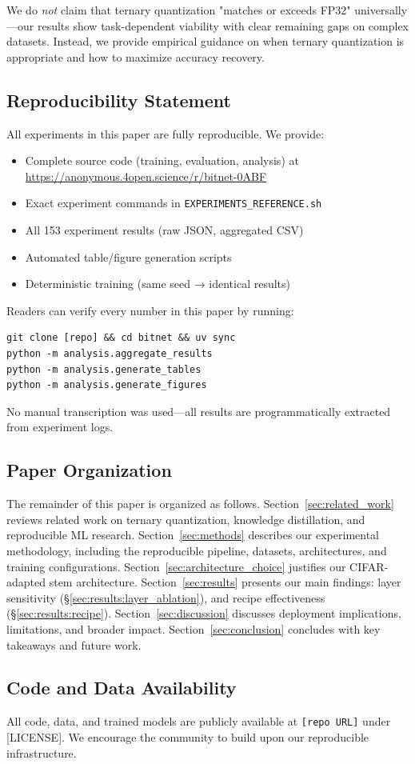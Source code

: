 We do \textit{not} claim that ternary quantization "matches or exceeds FP32" universally—our results show task-dependent viability with clear remaining gaps on complex datasets. Instead, we provide empirical guidance on when ternary quantization is appropriate and how to maximize accuracy recovery.

\subsection{Reproducibility Statement}

All experiments in this paper are fully reproducible. We provide:
\begin{itemize}
    \item Complete source code (training, evaluation, analysis) at \url{https://anonymous.4open.science/r/bitnet-0ABF}
    \item Exact experiment commands in \texttt{EXPERIMENTS\_REFERENCE.sh}
    \item All 153 experiment results (raw JSON, aggregated CSV)
    \item Automated table/figure generation scripts
    \item Deterministic training (same seed → identical results)
\end{itemize}

Readers can verify every number in this paper by running:
\begin{verbatim}
git clone [repo] && cd bitnet && uv sync
python -m analysis.aggregate_results
python -m analysis.generate_tables
python -m analysis.generate_figures
\end{verbatim}
No manual transcription was used—all results are programmatically extracted from experiment logs.

\subsection{Paper Organization}

The remainder of this paper is organized as follows. Section~\ref{sec:related_work} reviews related work on ternary quantization, knowledge distillation, and reproducible ML research. Section~\ref{sec:methods} describes our experimental methodology, including the reproducible pipeline, datasets, architectures, and training configurations. Section~\ref{sec:architecture_choice} justifies our CIFAR-adapted stem architecture. Section~\ref{sec:results} presents our main findings: layer sensitivity (§\ref{sec:results:layer_ablation}), and recipe effectiveness (§\ref{sec:results:recipe}). Section~\ref{sec:discussion} discusses deployment implications, limitations, and broader impact. Section~\ref{sec:conclusion} concludes with key takeaways and future work.

\subsection{Code and Data Availability}

All code, data, and trained models are publicly available at \texttt{[repo URL]} under [LICENSE]. We encourage the community to build upon our reproducible infrastructure.
